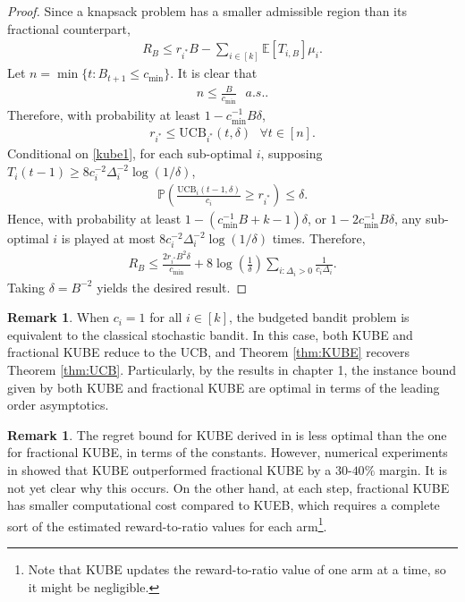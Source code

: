 \documentclass[letterpaper,11pt,openright,openany]{book}
\numberwithin{equation}{section}
\theoremstyle{plain}
\theoremstyle{definition}
\newtheorem{Rem}[Th]{Remark}
\def\E{{\mathbb E}}
\def\P{{\mathbb P}}
\begin{document}
\begin{proof}
Since a knapsack problem has a smaller admissible region than its fractional counterpart, 
\begin{align*}
R_B\leq r_{i^*}B-\sum_{i\in [k]}\E[T_{i,B}]\mu_i.
\end{align*}
Let $n = \min\{t: B_{t+1}\leq c_{\min}\}$.  
It is clear that 
\begin{align*}
n\leq\frac{B}{c_{\min}}\ \ \ a.s.. 
\end{align*}
Therefore, with probability at least $1-c_{\min}^{-1}B\delta$, 
\begin{align}
r_{i^*}\leq \text{UCB}_{i^*}(t, \delta)\ \ \ \forall t\in [n]. \label{kube1}
\end{align}
Conditional on \eqref{kube1}, for each sub-optimal $i$, supposing $T_i(t-1)\geq 8c_i^{-2}\Delta_i^{-2}\log(1/\delta)$, 
\begin{align*}
\P\left(\frac{\text{UCB}_i(t-1, \delta)}{c_i}\geq r_{i^*}\right)\leq\delta. 
\end{align*}
Hence, with probability at least $1-(c_{\min}^{-1}B+k-1)\delta$, or $1-2c_{\min}^{-1}B\delta$, any sub-optimal $i$ is played at most $8c_i^{-2}\Delta_i^{-2}\log(1/\delta)$ times. Therefore, 
\begin{align*}
R_B\leq\frac{2r_{i^*}B^2\delta}{c_{\min}}+8\log\left(\frac{1}{\delta}\right)\sum_{i: \Delta_i>0}\frac{1}{c_i\Delta_i}.
\end{align*}
Taking $\delta = B^{-2}$ yields the desired result.
\end{proof}

\begin{Rem}
When $c_i=1$ for all $i\in [k]$, the budgeted bandit problem is equivalent to the classical stochastic bandit. In this case, both KUBE and fractional KUBE reduce to the UCB, and Theorem \ref{thm:KUBE} recovers Theorem \ref{thm:UCB}. Particularly, by the results in chapter 1, the instance bound given by both KUBE and fractional KUBE are optimal in terms of the leading order asymptotics. 
\end{Rem}

\begin{Rem}
The regret bound for KUBE derived in \cite{tran2012knapsack} is less optimal than the one for fractional KUBE, in terms of the constants. However, numerical experiments in \cite{tran2012knapsack} showed that KUBE outperformed fractional KUBE by a $30$-$40\%$ margin. It is not yet clear why this occurs. On the other hand, at each step, fractional KUBE has smaller computational cost compared to KUEB, which requires a complete sort of the estimated reward-to-ratio values for each arm\footnote{Note that KUBE updates the reward-to-ratio value of one arm at a time, so it might be negligible.}. 
\end{Rem}
\end{document}
